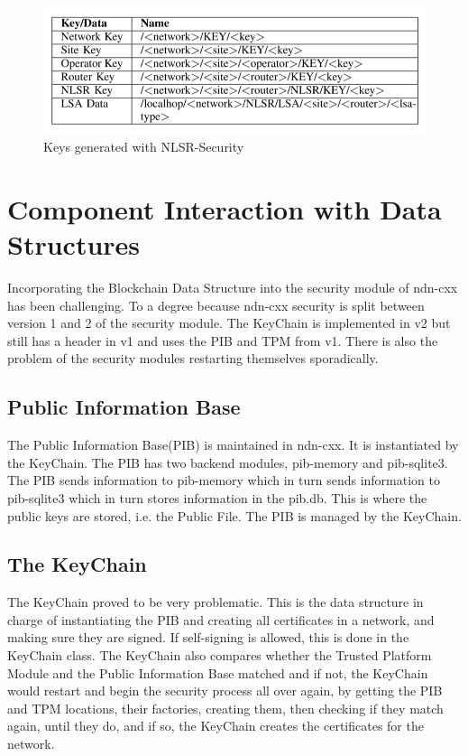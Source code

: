 \begin{figure}[ht]
\centering
\includegraphics[scale=0.6]{nlsr-sec.png}
\caption{Keys generated with NLSR-Security\cite{056}}
\end{figure}


\section{Component Interaction with Data Structures}
Incorporating the Blockchain Data Structure into the security module of ndn-cxx has been challenging. To a degree because ndn-cxx security is split between version 1 and 2 of the security module. The KeyChain is implemented in v2 but still has a header in v1 and uses the PIB and TPM from v1. There is also the problem of the security modules restarting themselves sporadically.
\subsection{Public Information Base}

The Public Information Base(PIB) is maintained in ndn-cxx. It is instantiated by the KeyChain. The PIB has two backend modules, pib-memory and pib-sqlite3. The PIB sends information to pib-memory which in turn sends information to pib-sqlite3 which in turn stores information in the pib.db. This is where the public keys are stored, i.e. the Public File. The PIB is managed by the KeyChain.

\subsection{The KeyChain}

The KeyChain proved to be very problematic. This is the data structure in charge of instantiating the PIB and creating all certificates in a network, and making sure they are signed. If self-signing is allowed, this is done in the KeyChain class. The KeyChain also compares whether the Trusted Platform Module and the Public Information Base matched and if not, the KeyChain would restart and begin the security process all over again, by getting the PIB and TPM locations, their factories, creating them, then checking if they match again, until they do, and if so, the KeyChain creates the certificates for the network.\par

